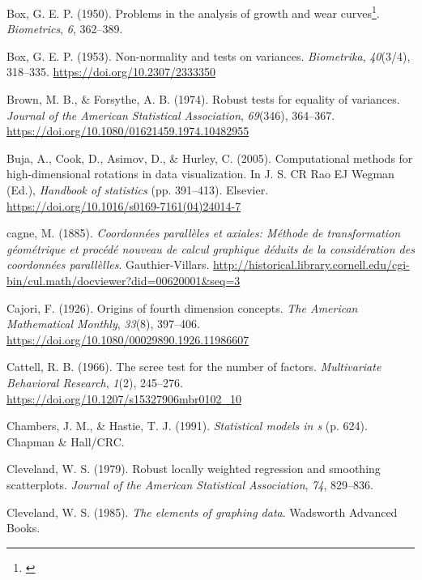 \documentclass[
  letterpaper,
  10pt,
  krantz2]{krantz}
\newlength{\cslhangindent}
\newenvironment{CSLReferences}[2] %
 {\begin{list}{}{%
  \setlength{\itemindent}{0pt}
  \setlength{\leftmargin}{0pt}
  \setlength{\parsep}{0pt}
  \ifodd #1
   \setlength{\leftmargin}{\cslhangindent}
   \setlength{\itemindent}{-1\cslhangindent}
  \fi
  \setlength{\itemsep}{#2\baselineskip}}}
 {\end{list}}
\providecommand{\href}[2]{#2\footnote{\url{#1}}}
\begin{document}
\begin{CSLReferences}{1}{0}
Box, G. E. P. (1950). \href{}{Problems in the analysis of growth and
wear curves}. \emph{Biometrics}, \emph{6}, 362--389.

Box, G. E. P. (1953). Non-normality and tests on variances.
\emph{Biometrika}, \emph{40}(3/4), 318--335.
\url{https://doi.org/10.2307/2333350}

Brown, M. B., \& Forsythe, A. B. (1974). Robust tests for equality of
variances. \emph{Journal of the American Statistical Association},
\emph{69}(346), 364--367.
\url{https://doi.org/10.1080/01621459.1974.10482955}

Buja, A., Cook, D., Asimov, D., \& Hurley, C. (2005). Computational
methods for high-dimensional rotations in data visualization. In J. S.
CR Rao EJ Wegman (Ed.), \emph{Handbook of statistics} (pp. 391--413).
Elsevier. \url{https://doi.org/10.1016/s0169-7161(04)24014-7}

cagne, M. (1885). \emph{Coordonn{é}es parall{è}les et axiales: M{é}thode
de transformation g{é}om{é}trique et proc{é}d{é} nouveau de calcul
graphique d{é}duits de la consid{é}ration des coordonn{é}es
parall{è}lles}. Gauthier-Villars.
\url{http://historical.library.cornell.edu/cgi-bin/cul.math/docviewer?did=00620001&seq=3}

Cajori, F. (1926). Origins of fourth dimension concepts. \emph{The
American Mathematical Monthly}, \emph{33}(8), 397--406.
\url{https://doi.org/10.1080/00029890.1926.11986607}

Cattell, R. B. (1966). The scree test for the number of factors.
\emph{Multivariate Behavioral Research}, \emph{1}(2), 245--276.
\url{https://doi.org/10.1207/s15327906mbr0102_10}

Chambers, J. M., \& Hastie, T. J. (1991). \emph{Statistical models in s}
(p. 624). Chapman \& Hall/CRC.

Cleveland, W. S. (1979). Robust locally weighted regression and
smoothing scatterplots. \emph{Journal of the American Statistical
Association}, \emph{74}, 829--836.

Cleveland, W. S. (1985). \emph{The elements of graphing data}. Wadsworth
Advanced Books.


\end{CSLReferences}
\end{document}
